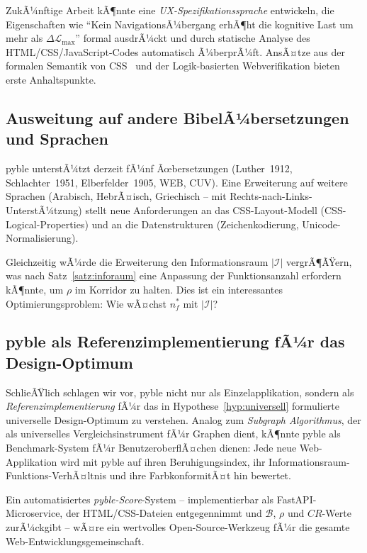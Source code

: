 ﻿\documentclass[a4paper,12pt]{article}
\theoremstyle{definition}
\begin{document}
ZukÃ¼nftige Arbeit kÃ¶nnte eine \emph{UX-Spezifikationssprache} entwickeln,
die Eigenschaften wie \enquote{Kein NavigationsÃ¼bergang erhÃ¶ht die kognitive
Last um mehr als $\Delta\mathcal{L}_{\max}$} formal ausdrÃ¼ckt und durch
statische Analyse des HTML/CSS/JavaScript-Codes automatisch Ã¼berprÃ¼ft.
AnsÃ¤tze aus der formalen Semantik von CSS~\cite{celik2016} und der
Logik-basierten Webverifikation bieten erste Anhaltspunkte.

\subsection{Ausweitung auf andere BibelÃ¼bersetzungen und Sprachen}

pyble unterstÃ¼tzt derzeit fÃ¼nf Ãœbersetzungen (Luther~1912, Schlachter~1951,
Elberfelder~1905, WEB, CUV). Eine Erweiterung auf weitere Sprachen
(Arabisch, HebrÃ¤isch, Griechisch -- mit Rechts-nach-Links-UnterstÃ¼tzung)
stellt neue Anforderungen an das CSS-Layout-Modell (CSS-Logical-Properties)
und an die Datenstrukturen (Zeichenkodierung, Unicode-Normalisierung).

Gleichzeitig wÃ¼rde die Erweiterung den Informationsraum $|\mathcal{I}|$
vergrÃ¶ÃŸern, was nach Satz~\ref{satz:inforaum} eine Anpassung der
Funktionsanzahl erfordern kÃ¶nnte, um $\rho$ im Korridor zu halten.
Dies ist ein interessantes Optimierungsproblem: Wie wÃ¤chst $n_f^*$ mit
$|\mathcal{I}|$?

\subsection{pyble als Referenzimplementierung fÃ¼r das Design-Optimum}

SchlieÃŸlich schlagen wir vor, pyble nicht nur als Einzelapplikation,
sondern als \emph{Referenzimplementierung} fÃ¼r das in Hypothese~\ref{hyp:universell}
formulierte universelle Design-Optimum zu verstehen. Analog zum
\emph{Subgraph Algorithmus}, der als universelles Vergleichsinstrument
fÃ¼r Graphen dient, kÃ¶nnte pyble als Benchmark-System fÃ¼r BenutzeroberflÃ¤chen
dienen: Jede neue Web-Applikation wird mit pyble auf ihren Beruhigungsindex,
ihr Informationsraum-Funktions-VerhÃ¤ltnis und ihre FarbkonformitÃ¤t hin
bewertet.

Ein automatisiertes \emph{pyble-Score}-System -- implementierbar als
FastAPI-Microservice, der HTML/CSS-Dateien entgegennimmt und $\mathcal{B}$,
$\rho$ und $CR$-Werte zurÃ¼ckgibt -- wÃ¤re ein wertvolles Open-Source-Werkzeug
fÃ¼r die gesamte Web-Entwicklungsgemeinschaft.
\end{document}
